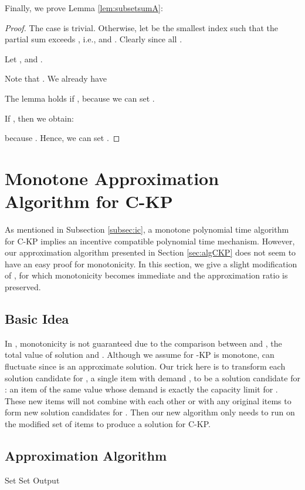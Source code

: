 \documentclass{aamas2013}
\begin{document}
Finally, we prove Lemma \ref{lem:subsetsumA}:

\begin{proof} 
The case  is trivial.  Otherwise, 
let  be the smallest index such that the partial sum exceeds , i.e.,  and .  Clearly  since all .

Let ,  and .  

Note that .  We already have 


The lemma holds if , because we can set .  

If , then we obtain:

because .
Hence, we can set .  
\end{proof}

\section{Monotone Approximation Algorithm for C-KP}\label{sec:monalg}
\noindent
As mentioned in Subsection \ref{subsec:ic}, a monotone polynomial time algorithm for C-KP
implies an incentive compatible polynomial time mechanism.  However, our approximation algorithm  presented in Section \ref{sec:algCKP} does not seem to have an easy proof for monotonicity.
In this section, we give a slight modification of , for which monotonicity becomes immediate and the approximation ratio is preserved.

\subsection{Basic Idea} \label{subsec:pic}
\noindent
In , monotonicity is not guaranteed due to the comparison between  and , the total value of solution  and .  Although we assume  for {-KP} is monotone,  can fluctuate since  is an approximate solution.  Our trick here is to transform each solution candidate for , a single item  with demand , to be a solution candidate for : an item of the same value whose demand is exactly the capacity limit  for .  These new items will not combine with each other or with any original items to form new solution candidates for .  Then our new algorithm  only needs to run  on the modified set of items to produce a solution for C-KP.  
  

\subsection{Approximation Algorithm} 

\begin{algorithm}[htb!]
\caption{}
\begin{algorithmic}[1]
\FOR{} 
\STATE Set 
\ENDFOR
\STATE Set 
\STATE Output 
\end{algorithmic}
\end{algorithm}
\end{document}

